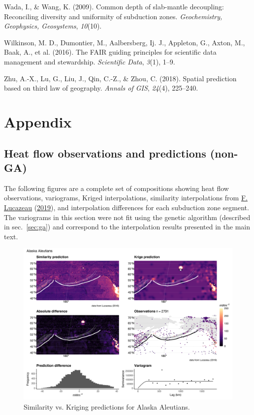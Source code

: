 \documentclass[draft,linenumbers]{agujournal2018}
\begin{document}
\leavevmode{}%
Wada, I., \& Wang, K. (2009). Common depth of slab-mantle decoupling:
Reconciling diversity and uniformity of subduction zones.
\emph{Geochemistry, Geophysics, Geosystems}, \emph{10}(10).

\leavevmode{}%
Wilkinson, M. D., Dumontier, M., Aalbersberg, Ij. J., Appleton, G.,
Axton, M., Baak, A., et al. (2016). The FAIR guiding principles for
scientific data management and stewardship. \emph{Scientific Data},
\emph{3}(1), 1--9.

\leavevmode{}%
Zhu, A.-X., Lu, G., Liu, J., Qin, C.-Z., \& Zhou, C. (2018). Spatial
prediction based on third law of geography. \emph{Annals of GIS},
\emph{24}(4), 225--240.

\section{Appendix}

\hypertarget{sec:comps}{%
\subsection{Heat flow observations and predictions
(non-GA)}\label{sec:comps}}

The following figures are a complete set of compositions showing heat
flow observations, variograms, Kriged interpolations, similarity
interpolations from \protect\hyperlink{ref-lucazeau2019}{F. Lucazeau}
(\protect\hyperlink{ref-lucazeau2019}{2019}), and interpolation
differences for each subduction zone segment. The variograms in this
section were not fit using the genetic algorithm (described in
sec.~\ref{sec:ga}) and correspond to the interpolation results presented
in the main text.

\begin{figure}[h]

{\centering \includegraphics[width=0.95\linewidth,]{../figs/diff/comp/Alaska_Aleutians} 

}

\caption{Similarity vs. Kriging predictions for Alaska Aleutians.}\label{fig:alaska.comp}
\end{figure}
\end{document}
